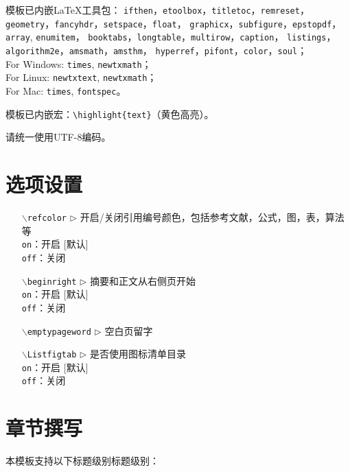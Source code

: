 模板已内嵌LaTeX工具包：
 {\tt ifthen}，{\tt etoolbox}，{\tt titletoc}，{\tt remreset}，
 {\tt geometry}，{\tt fancyhdr}，{\tt setspace}，{\tt float}，
 {\tt graphicx}，{\tt subfigure}，{\tt epstopdf}，{\tt array}, {\tt enumitem}，
 {\tt booktabs}，{\tt longtable}，{\tt multirow}，{\tt caption}，
 {\tt listings}，{\tt algorithm2e}，{\tt amsmath}，{\tt amsthm}，
 {\tt hyperref}，{\tt pifont}，{\tt color}，{\tt soul}；\\
 For Windows: {\tt times}, {\tt newtxmath}；\\
 For Linux: {\tt newtxtext}, {\tt newtxmath}；\\
 For Mac: {\tt times}, {\tt fontspec}。

模板已内嵌宏：\verb|\highlight{text}|（黄色高亮）。

请统一使用UTF-8编码。



\section{选项设置}

\begin{itemize}[leftmargin=3cm]
  \item[{\tt  $\backslash$refcolor} $\triangleright$]  开启/关闭引用编号颜色，包括参考文献，公式，图，表，算法等\\
  \texttt{on}：开启 [默认]\\
  \texttt{off}：关闭
  \item[{\tt $\backslash$beginright} $\triangleright$]  摘要和正文从右侧页开始\\
  \texttt{on}：开启 [默认]\\
  \texttt{off}：关闭
  \item[{\tt $\backslash$emptypageword} $\triangleright$]  空白页留字
  \item[{\tt $\backslash$Listfigtab} $\triangleright$]  是否使用图标清单目录\\
  \texttt{on}：开启 [默认]\\
  \texttt{off}：关闭
\end{itemize}


\section{章节撰写}
本模板支持以下标题级别标题级别：

